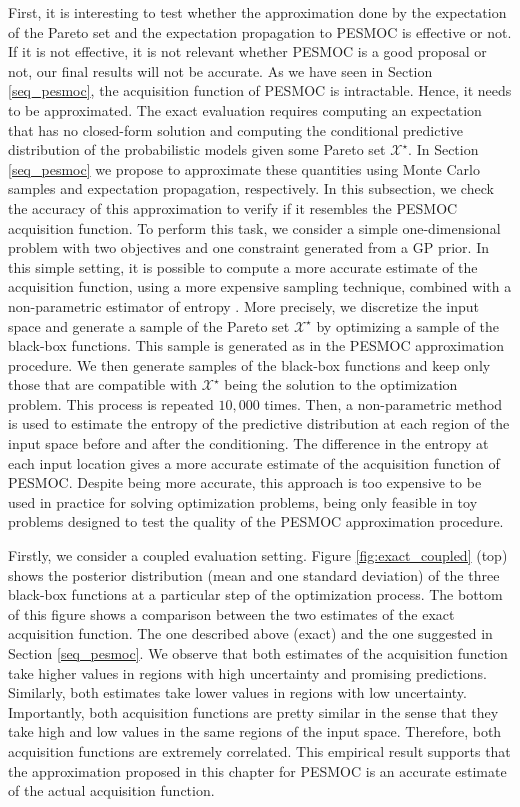 First, it is interesting to test whether the approximation done by the expectation of the Pareto set and the expectation propagation to PESMOC is effective or not. If it is not effective, it is not relevant whether PESMOC is a good proposal or not, our final results will not be accurate. As we have seen in Section \ref{seq_pesmoc}, the acquisition function of PESMOC is intractable. Hence, it needs to be
approximated. The exact evaluation requires computing an expectation that has no closed-form solution and computing the conditional predictive distribution of the probabilistic models given some Pareto set $\mathcal{X}^\star$.
In Section \ref{seq_pesmoc} we propose to approximate these quantities using Monte Carlo samples and expectation propagation, respectively.
In this subsection, we check the accuracy of this approximation to verify if it resembles the PESMOC acquisition function.
To perform this task, we consider a simple one-dimensional problem with two objectives and one constraint generated from a
GP prior. In this simple setting, it is possible to compute a more accurate estimate of the acquisition function, using a more expensive sampling technique, combined with a non-parametric estimator of entropy \citep{singh2003nearest}.
More precisely, we discretize the input space and generate a sample of the Pareto set $\mathcal{X}^\star$ by optimizing
a sample of the black-box functions. This sample is generated as in the PESMOC approximation procedure. We then generate
samples of the black-box functions and keep only those that are compatible with $\mathcal{X}^\star$ being the
solution to the optimization problem. This process is repeated $10,000$ times. Then, a non-parametric method is used
to estimate the entropy of the predictive distribution at each region of the input space before and after the conditioning.
The difference in the entropy at each input location gives a more accurate estimate of the acquisition function of PESMOC.
Despite being more accurate, this approach is too expensive to be used in practice for solving optimization problems, being 
only feasible in toy problems designed to test the quality of the PESMOC approximation procedure.

Firstly, we consider a coupled evaluation setting. Figure \ref{fig:exact_coupled} (top) shows the posterior distribution
(mean and one standard deviation) of the three black-box functions at a particular step of the optimization process.
The bottom of this figure shows a comparison between the two estimates of the exact acquisition function.
The one described above (exact) and the one suggested in Section \ref{seq_pesmoc}.
We observe that both estimates of the acquisition function take higher values in regions with high
uncertainty and promising predictions. Similarly, both estimates take lower values in regions with low uncertainty.
Importantly, both acquisition functions are pretty similar in the sense that they take high and low values in the
same regions of the input space. Therefore, both acquisition functions are extremely correlated. This
empirical result supports that the approximation proposed in this chapter for PESMOC is an accurate estimate of the
actual acquisition function.

